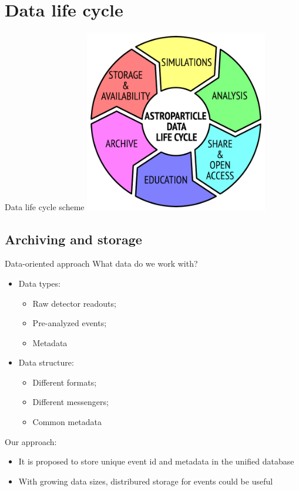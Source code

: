 \section{Data life cycle}

\begin{frame}{Data life cycle scheme}
\centering
\includegraphics[width=0.6\textwidth]{pics/ADLC.pdf}
\end{frame}

\subsection{Archiving and storage}

\begin{frame}{Data-oriented approach}
What data do we work with?


\parbox{0.48\textwidth}{
\begin{itemize}
  \item Data types:
  \begin{itemize}
    \item Raw detector readouts;
    \item Pre-analyzed events;
    \item Metadata
  \end{itemize}
\end{itemize}
}
\hfill
\parbox{0.48\textwidth}{
\begin{itemize}
  \item Data structure:
  \begin{itemize}
    \item Different formats;
    \item Different messengers;
    \item Common metadata
  \end{itemize}
\end{itemize}
}

Our approach:
\begin{itemize}
 \item It is proposed to store unique event id and metadata in the unified database
 \item With growing data sizes, distribured storage for events could be useful
\end{itemize}
\end{frame}

